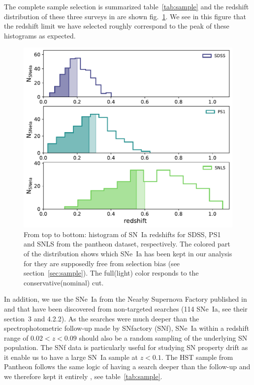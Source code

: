 \documentclass[]{aa} %
\newcommand{\nn}[1]{{\textcolor[rgb]{1, 0.27, 0}{#1}}}
\begin{document}
The complete sample selection is summarized table~\ref{tab:sample} and the
redshift distribution of these three surveys in are shown fig.~\ref{fig:cuts}.
We see in this figure that the redshift limit we have selected roughly
correspond to the peak of these histograms as expected.

\begin{figure}
    \centering
    \includegraphics[width=0.9\linewidth]{Article_figures/hist_surveys_cuts.pdf}
    \caption{From top to bottom: histogram of SN~Ia redshifts for SDSS, PS1 and
    SNLS from the pantheon dataset, respectively. The colored part of the
distribution shows which SNe~Ia has been kept in our analysis for they are
supposedly free from selection bias (see section~\ref{sec:sample}). The
full(light) color responds to the conservative(nominal) cut.}
    \label{fig:cuts}
\end{figure}

In addition, we use the SNe~Ia from the Nearby Supernova Factory
\citep[SNfactory][]{aldering2004} published in \cite{rigault2018} and that have
been discovered from non-targeted searches (114 SNe~Ia, see their section~3 and
4.2.2). As the searches were much deeper than the spectrophotometric follow-up
made by SNfactory \nn{(SNf)}, SNe~Ia within a redshift range of $0.02<z<0.09$
\citep[as in ][]{rigault2018} should also be a random sampling of the underlying
SN population. The SNf data is particularly useful for studying SN property
drift as it enable us to have a large SN~Ia sample at $z<0.1$.  The HST sample
from Pantheon follows the same logic of having a search deeper than the
follow-up and we therefore kept it entirely \citep{FIND BACK THE REF}, see
table~\ref{tab:sample}.
\end{document}
